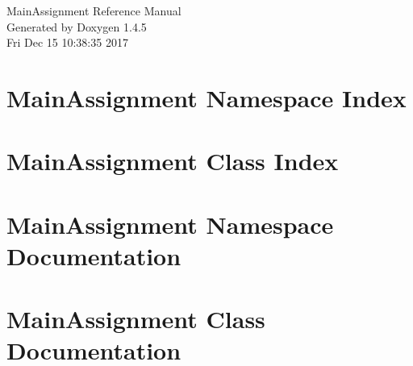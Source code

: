 \documentclass[a4paper]{book}
\begin{document}
\begin{titlepage}
\vspace*{7cm}
\begin{center}
{\Large Main\-Assignment Reference Manual}\\
\vspace*{1cm}
{\large Generated by Doxygen 1.4.5}\\
\vspace*{0.5cm}
{\small Fri Dec 15 10:38:35 2017}\\
\end{center}
\end{titlepage}
\clearemptydoublepage
{}
\tableofcontents
\clearemptydoublepage
{}
\chapter{Main\-Assignment Namespace Index}

\chapter{Main\-Assignment Class Index}

\chapter{Main\-Assignment Namespace Documentation}

\chapter{Main\-Assignment Class Documentation}












\printindex
\end{document}
